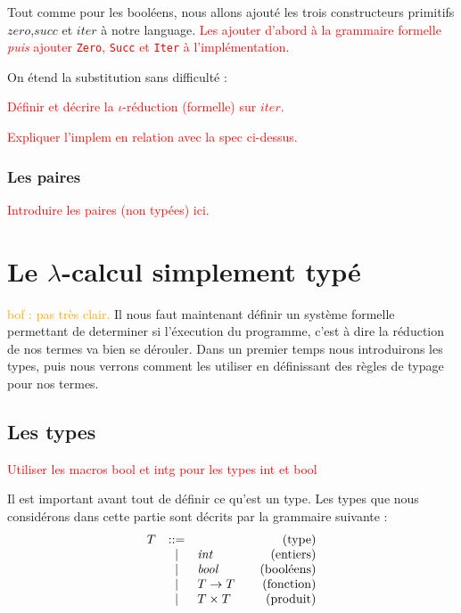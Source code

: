 \documentclass {article}
\makeatletter
\newcommand{\codefrom}[3]
           {}
\theoremstyle{definition}
\theoremstyle{remark}
\newcommand{\todo}[1]{\textcolor{red}{#1}}
\newcommand{\attention}[1]{\textcolor{orange}{#1}}
\newenvironment{bnf}
               {\[\begin{array}{lcl@{\qquad}r}}
               {\end{array}\]}
\makeatother
\begin{document}
\newcommand{\zero}{\ensuremath{\mathit{zero}}}
\newcommand{\succs}{\ensuremath{\mathit{succ}}}
\newcommand{\iter}{\ensuremath{\mathit{iter}}}

\newcommand{\NZero}{\lstinline!Zero!}
\newcommand{\NSucc}{\lstinline!Succ!}
\newcommand{\NIter}{\lstinline!Iter!}

Tout comme pour les booléens, nous allons ajouté les trois
constructeurs primitifs \zero{},\succs{} et \iter{} à notre
language. \todo{Les ajouter d'abord à la grammaire formelle
  \emph{puis} ajouter \NZero{}, \NSucc{} et \NIter{} à l'implémentation.}

\codefrom{untyped}{lambda}{nat_term}

On étend la substitution sans difficulté :
\codefrom{untyped}{lambda}{nat_substitution}

\todo{Définir et décrire la \(\iota\)-réduction (formelle) sur \iter.}

\todo{Expliquer l'implem en relation avec la spec ci-dessus.}
\codefrom{untyped}{lambda}{nat_evaluation}

\subsubsection{Les paires}

\todo{Introduire les paires (non typées) ici.}

\section{Le $\lambda$-calcul simplement typé}

\attention{bof : pas très clair.} Il nous faut maintenant définir un système formelle permettant de determiner si l'éxecution du programme,
c'est à dire la réduction de nos termes va bien se dérouler. Dans un premier temps nous introduirons les 
types, puis nous verrons comment les utiliser en définissant des règles de typage pour nos termes.

\subsection{Les types}
\label{simple_type}

\todo{Utiliser les macros bool et intg pour les types int et bool}

\newcommand{\intg}{\ensuremath{\mathit{int}}}
\newcommand{\bool}{\ensuremath{\mathit{bool}}}

Il est important avant tout de définir ce qu'est un type. Les types
que nous considérons dans cette partie sont décrits par la grammaire
suivante :
%
\begin{bnf}
  T &::=& &\mbox{(type)}\\
  &|& \intg{} &\mbox{(entiers)}\\ 
  &|& \bool{} &\mbox{(booléens)}\\
  &|& T \rightarrow T &\mbox{(fonction)}\\
  &|& T \times T &\mbox{(produit)}\\
\end{bnf}
\end{document}
